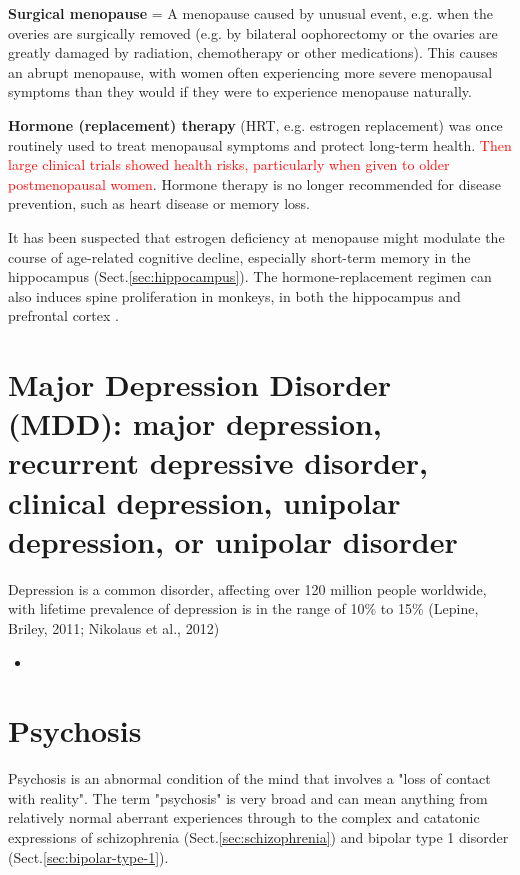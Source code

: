 {\bf Surgical menopause} = A menopause caused by unusual event, e.g. when the
overies are surgically removed (e.g. by bilateral oophorectomy or the ovaries
are greatly damaged by radiation, chemotherapy or other medications).
This causes an abrupt menopause, with women often experiencing more severe
menopausal symptoms than they would if they were to experience menopause
naturally.

{\bf Hormone (replacement) therapy} (HRT, e.g. estrogen replacement) was once
routinely used to treat menopausal symptoms and protect long-term health.
\textcolor{red}{Then large clinical trials showed health risks, particularly
when given to older postmenopausal women}. Hormone therapy is no longer
recommended for disease prevention, such as heart disease or memory loss.


It has been suspected that  estrogen deficiency at menopause might modulate the
course of age-related cognitive decline, especially short-term memory in the
hippocampus \citep{rapp2003} (Sect.\ref{sec:hippocampus}). The
hormone-replacement regimen can also induces spine proliferation in monkeys, in both the hippocampus and prefrontal cortex
\citep{hao2007}.


\section{Major Depression Disorder (MDD): major
depression, recurrent depressive disorder, clinical depression,
unipolar depression, or unipolar disorder}
\label{sec:MDD}
\label{sec:unipolar-disorder}


Depression is a common disorder, affecting over 120 million people worldwide, 
with  lifetime prevalence of depression is in the range of 10\% to 15\%
(Lepine, Briley, 2011; Nikolaus et al., 2012)
\begin{itemize}
  \item 
\end{itemize}

\section{Psychosis}
\label{sec:psychosis}

Psychosis is an abnormal condition of the mind that involves a "loss of contact
with reality". The term "psychosis" is very broad and can mean anything from
relatively normal aberrant experiences through to the complex and catatonic
expressions of schizophrenia (Sect.\ref{sec:schizophrenia}) and bipolar type 1
disorder (Sect.\ref{sec:bipolar-type-1}).

